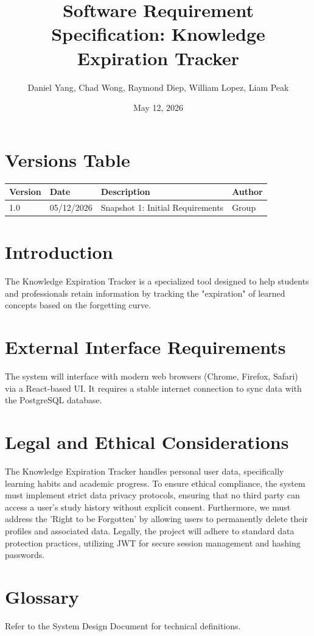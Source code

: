 \documentclass{article}
\title{Software Requirement Specification: Knowledge Expiration Tracker}
\author{Daniel Yang, Chad Wong, Raymond Diep, William Lopez, Liam Peak}
\date{May 12, 2026}
\begin{document}
\maketitle
\newpage
\tableofcontents
\newpage

\section{Versions Table}
\begin{tabular}{|l|l|l|l|}
\hline
\textbf{Version} & \textbf{Date} & \textbf{Description} & \textbf{Author} \\ \hline
1.0 & 05/12/2026 & Snapshot 1: Initial Requirements & Group \\ \hline
\end{tabular}

\section{Introduction}
The Knowledge Expiration Tracker is a specialized tool designed to help students and professionals retain information by tracking the "expiration" of learned concepts based on the forgetting curve.

\section{External Interface Requirements}
The system will interface with modern web browsers (Chrome, Firefox, Safari) via a React-based UI. It requires a stable internet connection to sync data with the PostgreSQL database.

\section{Legal and Ethical Considerations}
The Knowledge Expiration Tracker handles personal user data, specifically learning habits and academic progress. To ensure ethical compliance, the system must implement strict data privacy protocols, ensuring that no third party can access a user’s study history without explicit consent. Furthermore, we must address the 'Right to be Forgotten' by allowing users to permanently delete their profiles and associated data. Legally, the project will adhere to standard data protection practices, utilizing JWT for secure session management and hashing passwords.

\section{Glossary}
Refer to the System Design Document for technical definitions.
\end{document}
